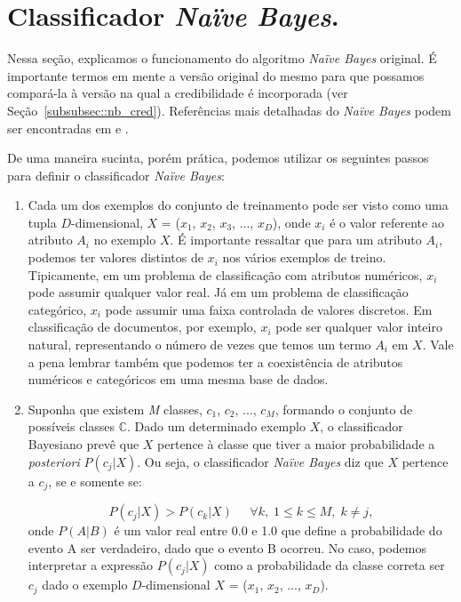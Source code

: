 
\section{Classificador \textit{Naïve Bayes}.}
\label{subsec::cred_nb}

Nessa seção, explicamos o funcionamento do algoritmo \textit{Naïve Bayes} original. É importante termos em mente a versão original do mesmo para que possamos compará-la à versão na qual a credibilidade é incorporada (ver Seção~\ref{subsubsec::nb_cred}). Referências mais detalhadas do \textit{Naïve Bayes} podem ser encontradas em \cite{DHS01} e \cite{Manning08}.

De uma maneira sucinta, porém prática, podemos utilizar os seguintes passos para definir o classificador \textit{Naïve Bayes}:

\begin{enumerate}
    \item Cada um dos exemplos do conjunto de treinamento pode ser visto como uma tupla $D$-dimensional, $X$ = ($x_1$, $x_2$, $x_3$, ..., $x_D$), onde $x_i$ é o valor referente ao atributo $A_i$ no exemplo $X$. É importante ressaltar que para um atributo $A_i$, podemos ter valores distintos de $x_i$ nos vários exemplos de treino. Tipicamente, em um problema de classificação com atributos numéricos, $x_i$ pode assumir qualquer valor real. Já em um problema de classificação categórico, $x_i$ pode assumir uma faixa controlada de valores discretos. Em classificação de documentos, por exemplo, $x_i$ pode ser qualquer valor inteiro natural, representando o número de vezes que temos um termo $A_i$ em $X$. Vale a pena lembrar também que podemos ter a coexistência de atributos numéricos e categóricos em uma mesma base de dados.
    

    \item Suponha que existem \textit{M} classes, $c_1$, $c_2$, ..., $c_\textit{M}$, formando o conjunto de possíveis classes $\mathbb{C}$. Dado um determinado exemplo $X$, o classificador Bayesiano prevê que $X$ pertence à classe que tiver a maior probabilidade a \textit{posteriori} $P(c_j|X)$. Ou seja, o classificador \textit{Naïve Bayes} diz que $X$ pertence a $c_j$, se e somente se:
        
\begin{equation}\label{eqn::max_pcgivenx}
   P(c_{j}|X) > P(c_{k}|X) \;\;\;\;\;\forall k,\; 1 \le k \le M, \; k \not= j,
\end{equation}
onde $P(A|B)$ é um valor real entre 0.0 e 1.0 que define a probabilidade do evento A ser verdadeiro, dado que o evento B ocorreu. No caso, podemos interpretar a expressão $P(c_j|X)$ como a probabilidade da classe correta ser $c_j$ dado o exemplo $D$-dimensional $X$ = ($x_1$, $x_2$, ..., $x_D$).


\end{enumerate}
